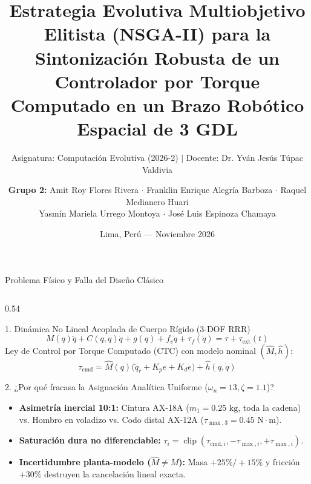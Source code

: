 \documentclass[aspectratio=169,9pt]{beamer}
\title[Control Robótico 3-DOF con NSGA-II]{\textbf{Estrategia Evolutiva Multiobjetivo Elitista (NSGA-II) para la Sintonización Robusta de un Controlador por Torque Computado en un Brazo Robótico Espacial de 3 GDL}}
\subtitle{Asignatura: Computación Evolutiva (2026-2) $\mid$ Docente: Dr. Yván Jesús Túpac Valdivia}
\author[Grupo 2 — MAE-IA UNI]{\textbf{Grupo 2:} Amit Roy Flores Rivera $\cdot$ Franklin Enrique Alegría Barboza $\cdot$ Raquel Medianero Huari \\
Yasmín Mariela Urrego Montoya $\cdot$ José Luis Espinoza Chamaya}
\institute[UNI FIIS]{Universidad Nacional de Ingeniería — Facultad de Ingeniería Industrial y de Sistemas\\[0.08cm]
\textbf{Repositorio GitHub:} \url{https://github.com/yasminum/NSGA-II-evol-strategic-multi}}
\date{Lima, Perú — Noviembre 2026}
\begin{document}
\begin{frame}
    \titlepage
\end{frame}

\begin{frame}{Problema Físico y Falla del Diseño Clásico}
\vspace{-0.15cm}
\begin{columns}[T,onlytextwidth]
\begin{column}{0.54\textwidth}
    \begin{block}{\footnotesize 1. Dinámica No Lineal Acoplada de Cuerpo Rígido (3-DOF RRR)}
        \scriptsize
        \vspace{-0.15cm}
        \[
            M(q)\ddot{q} + C(q,\dot{q})\dot{q} + g(q) + f_v\dot{q} + \tau_f(\dot{q}) = \tau + \tau_{\text{ext}}(t)
        \]
        \vspace{-0.2cm}
        Ley de Control por Torque Computado (CTC) con modelo nominal $(\hat{M}, \hat{h})$:
        \vspace{-0.15cm}
        \[
            \tau_{\text{cmd}} = \hat{M}(q)\big(\ddot{q}_r + K_p e + K_d \dot{e}\big) + \hat{h}(q,\dot{q})
        \]
        \vspace{-0.2cm}
    \end{block}
    \vspace{-0.1cm}
    \begin{alertblock}{\footnotesize 2. ¿Por qué fracasa la Asignación Analítica Uniforme ($\omega_n=13, \zeta=1.1$)?}
        \scriptsize
        \begin{itemize}\setlength{\itemsep}{1pt}
            \item \textbf{Asimetría inercial 10:1:} Cintura AX-18A ($m_1=0.25\text{ kg}$, toda la cadena) vs. Hombro en voladizo vs. Codo distal AX-12A ($\tau_{\max,3}=0.45\text{ N}\cdot\text{m}$).
            \item \textbf{Saturación dura no diferenciable:} $\tau_i = \operatorname{clip}(\tau_{\text{cmd},i}, -\tau_{\max,i}, +\tau_{\max,i})$.
            \item \textbf{Incertidumbre planta-modelo ($\hat{M} \neq M$):} Masa $+25\%/+15\%$ y fricción $+30\%$ destruyen la cancelación lineal exacta.

\end{itemize}
\end{alertblock}
\end{column}
\end{columns}
\end{frame}
\end{document}
